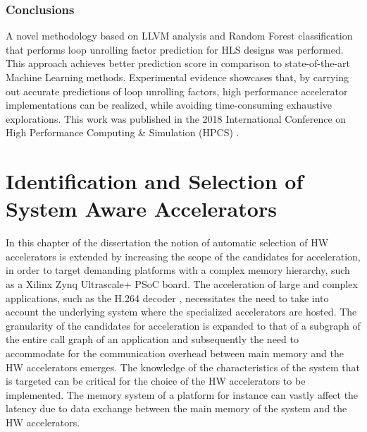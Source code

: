 \documentclass[]{usiinfthesis}
\begin{document}
\subsection{Conclusions}

A novel methodology based on LLVM analysis and Random Forest classification that performs loop unrolling 
factor prediction for HLS designs was performed. This approach achieves better prediction score 
in comparison to state-of-the-art Machine Learning methods. Experimental evidence showcases that, 
by carrying out accurate predictions of loop unrolling factors, high performance accelerator 
implementations can be realized, while avoiding time-consuming exhaustive explorations. This work was 
published in the 2018 International Conference on High Performance Computing \& Simulation (HPCS) 
\cite{ZacharopoulosJul18}.


%
%
%
%
%  
%
%
%
%
%


\chapter[Identification and Selection of System Aware Accelerators]
{Identification and Selection of \\ System Aware Accelerators}

In this chapter of the dissertation the notion of automatic selection of HW accelerators is extended
by increasing the scope of the candidates for acceleration, in order to target demanding platforms 
with a complex memory hierarchy, such as a Xilinx Zynq Ultrascale+ PSoC board.
The acceleration of large and complex
applications, such as the H.264 decoder \cite{LiuFeb16}, necessitates the need to take into account the 
underlying system where the specialized accelerators are hosted. 
The granularity of the candidates for acceleration is 
expanded to that of a subgraph of the entire call graph of an application and subsequently the need to 
accommodate for the communication overhead between main memory and the HW accelerators emerges.
The knowledge
of the characteristics of the system that is targeted can be critical for the choice of the HW accelerators
to be implemented. The memory system of a platform for instance can vastly affect the latency due to data
exchange between the main memory of the system and the HW accelerators.\par
\end{document}
